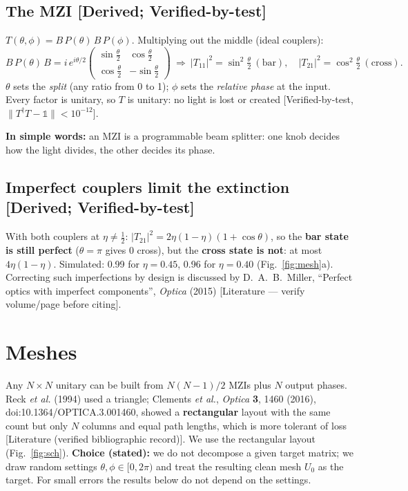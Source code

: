 \documentclass[10pt,a4paper]{article}
\newcommand{\evd}[1]{\textsf{\small[#1]}}
\newcommand{\simple}[1]{\par\noindent\textbf{In simple words:} #1\par\smallskip}
\begin{document}
\subsection{The MZI \evd{Derived; Verified-by-test}}
$T(\theta,\phi)=B\,P(\theta)\,B\,P(\phi)$. Multiplying out the middle (ideal couplers):
\[
B\,P(\theta)\,B=i\,e^{i\theta/2}\begin{pmatrix}\sin\frac\theta2 & \cos\frac\theta2\\ \cos\frac\theta2 & -\sin\frac\theta2\end{pmatrix}
\ \Rightarrow\ |T_{11}|^2=\sin^2\tfrac\theta2\ (\text{bar}),\quad |T_{21}|^2=\cos^2\tfrac\theta2\ (\text{cross}).
\]
$\theta$ sets the \emph{split} (any ratio from 0 to 1); $\phi$ sets the \emph{relative phase} at the input. Every factor is unitary, so $T$ is unitary: no light is lost or created \evd{Verified-by-test, $\|T^\dagger T-\mathbb1\|<10^{-12}$}.
\simple{an MZI is a programmable beam splitter: one knob decides how the light divides, the other decides its phase.}

\subsection{Imperfect couplers limit the extinction \evd{Derived; Verified-by-test}}
With both couplers at $\eta\ne\tfrac12$:
$|T_{21}|^2=2\eta(1-\eta)(1+\cos\theta)$, so the \textbf{bar state is still perfect} ($\theta=\pi$ gives 0 cross), but the \textbf{cross state is not}: at most $4\eta(1-\eta)$. Simulated: 0.99 for $\eta=0.45$, 0.96 for $\eta=0.40$ (Fig.~\ref{fig:mesh}a). Correcting such imperfections by design is discussed by D.~A.~B.~Miller, ``Perfect optics with imperfect components'', \emph{Optica} (2015) \evd{Literature --- verify volume/page before citing}.

\section{Meshes}
Any $N\times N$ unitary can be built from $N(N-1)/2$ MZIs plus $N$ output phases. Reck \emph{et al.} (1994) used a triangle; Clements \emph{et al.}, \emph{Optica} \textbf{3}, 1460 (2016), doi:10.1364/OPTICA.3.001460, showed a \textbf{rectangular} layout with the same count but only $N$ columns and equal path lengths, which is more tolerant of loss \evd{Literature (verified bibliographic record)}. We use the rectangular layout (Fig.~\ref{fig:sch}). \textbf{Choice (stated):} we do not decompose a given target matrix; we draw random settings $\theta,\phi\in[0,2\pi)$ and treat the resulting clean mesh $U_0$ as the target. For small errors the results below do not depend on the settings.
\end{document}
